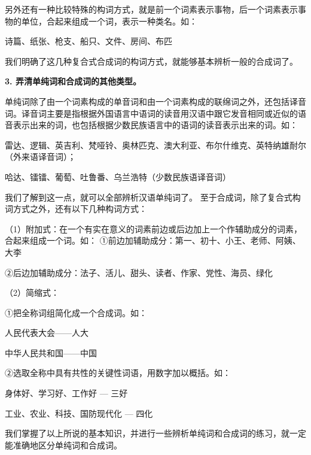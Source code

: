 另外还有一种比较特殊的构词方式，就是前一个词素表示事物，后一个词素表示事物的单位，合起来组成一个词，表示一种类名。如：

诗篇、纸张、枪支、船只、文件、房间、布匹

我们明确了这几种复合式合成词的构词方式，就能够基本辨析一般的合成词了。

\textbf{3. 弄清单纯词和合成词的其他类型。}

单纯词除了由一个词素构成的单音词和由一个词素构成的联绵词之外，还包括译音词。译音词主要是指根据外国语言中语词的读音用汉语中跟它发音相同或近似的语音表示出来的词，也包括根据少数民族语言中的语词的读音表示出来的词。如：

雷达、逻辑、英吉利、梵哑铃、奥林匹克、澳大利亚、布尔什维克、英特纳雄耐尔（外来语译音词）；

哈达、镭镭、葡萄、吐鲁番、乌兰浩特（少数民族语译音词）

我们了解到这一点，就可以全部辨析汉语单纯词了。
至于合成词，除了复合式构词方式之外，还有以下几种构词方式：

（1）附加式：在一个有实在意义的词素前边或后边加上一个作辅助成分的词素，合起来组成一个词。如：
①前边加辅助成分：第一、初十、小王、老师、阿姨、大李

②后边加辅助成分：法子、活儿、甜头、读者、作家、党性、海员、绿化

（2）简缩式：

①把全称词组简化成一个合成词。如：

人民代表大会——人大

中华人民共和国——中国

②选取全称中具有共性的关键性词语，用数字加以概括。如：

身体好、学习好、工作好 --- 三好

工业、农业、科技、国防现代化 --- 四化

我们掌握了以上所说的基本知识，并进行一些辨析单纯词和合成词的练习，就一定能准确地区分单纯词和合成词。
\newpage